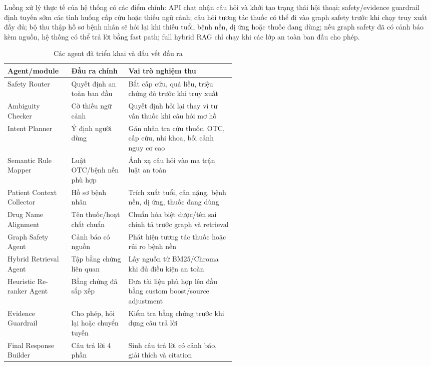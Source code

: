 Luồng xử lý thực tế của hệ thống có các điểm chính: API chat nhận câu hỏi và khởi tạo trạng thái hội thoại; safety/evidence guardrail định tuyến sớm các tình huống cấp cứu hoặc thiếu ngữ cảnh; câu hỏi tương tác thuốc có thể đi vào graph safety trước khi chạy truy xuất đầy đủ; bộ thu thập hồ sơ bệnh nhân sẽ hỏi lại khi thiếu tuổi, bệnh nền, dị ứng hoặc thuốc đang dùng; nếu graph safety đã có cảnh báo kèm nguồn, hệ thống có thể trả lời bằng fast path; full hybrid RAG chỉ chạy khi các lớp an toàn ban đầu cho phép.

\begin{table}[H]
\centering
\small
\caption{Các agent đã triển khai và dấu vết đầu ra}
\begin{tabularx}{\linewidth}{p{0.28\linewidth} p{0.25\linewidth} Y}
\toprule
\textbf{Agent/module} & \textbf{Đầu ra chính} & \textbf{Vai trò nghiệm thu} \\
\midrule
Safety Router & Quyết định an toàn ban đầu & Bắt cấp cứu, quá liều, triệu chứng đỏ trước khi truy xuất \\
Ambiguity Checker & Cờ thiếu ngữ cảnh & Quyết định hỏi lại thay vì tư vấn thuốc khi câu hỏi mơ hồ \\
Intent Planner & Ý định người dùng & Gán nhãn tra cứu thuốc, OTC, cấp cứu, nhi khoa, bối cảnh nguy cơ cao \\
Semantic Rule Mapper & Luật OTC/bệnh nền phù hợp & Ánh xạ câu hỏi vào ma trận luật an toàn \\
Patient Context Collector & Hồ sơ bệnh nhân & Trích xuất tuổi, cân nặng, bệnh nền, dị ứng, thuốc đang dùng \\
Drug Name Alignment & Tên thuốc/hoạt chất chuẩn & Chuẩn hóa biệt dược/tên sai chính tả trước graph và retrieval \\
Graph Safety Agent & Cảnh báo có nguồn & Phát hiện tương tác thuốc hoặc rủi ro bệnh nền \\
Hybrid Retrieval Agent & Tập bằng chứng liên quan & Lấy nguồn từ BM25/Chroma khi đủ điều kiện an toàn \\
Heuristic Re-ranker Agent & Bằng chứng đã sắp xếp & Đưa tài liệu phù hợp lên đầu bằng custom boost/source adjustment \\
Evidence Guardrail & Cho phép, hỏi lại hoặc chuyển tuyến & Kiểm tra bằng chứng trước khi dựng câu trả lời \\
Final Response Builder & Câu trả lời 4 phần & Sinh câu trả lời có cảnh báo, giải thích và citation \\
\bottomrule
\end{tabularx}
\end{table}

